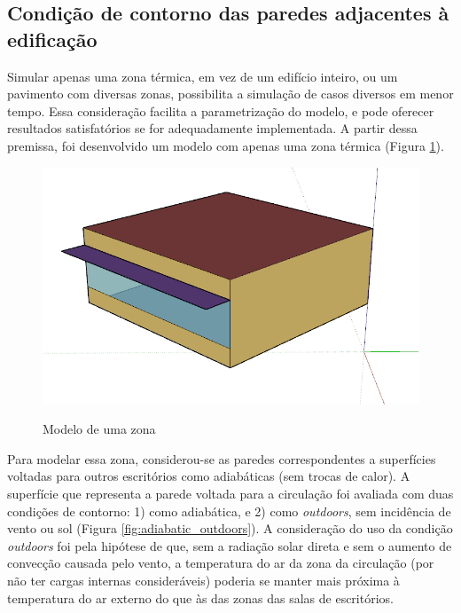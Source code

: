 \documentclass[brazil,hardcopy,openany]{ufscthesis} %
\newcommand{\figsize}{.6}
\begin{document}
\subsection*{Condição de contorno das paredes adjacentes à edificação}

Simular apenas uma zona térmica, em vez de um edifício inteiro, ou um pavimento com diversas zonas, possibilita a simulação de casos diversos em menor tempo.
Essa consideração facilita a parametrização do modelo, e pode oferecer resultados satisfatórios se for adequadamente implementada.
A partir dessa premissa, foi desenvolvido um modelo com apenas uma zona térmica (Figura \ref{fig:singlezone}).

\begin{figure}[h]
	\centering
	\caption{Modelo de uma zona}
	\includegraphics[width=\figsize\linewidth]{img/model.PNG}
	\label{fig:singlezone}
\end{figure}

Para modelar essa zona, considerou-se as paredes correspondentes a superfícies voltadas para outros escritórios como adiabáticas (sem trocas de calor). A superfície que representa a parede voltada para a circulação foi avaliada com duas condições de contorno: 1) como adiabática, e 2) como \textit{outdoors}, sem incidência de vento ou sol (Figura \ref{fig:adiabatic_outdoors}).	
A consideração do uso da condição \textit{outdoors} foi pela hipótese de que, sem a radiação solar direta e sem o aumento de convecção causada pelo vento, a temperatura do ar da zona da circulação (por não ter cargas internas consideráveis) poderia se manter mais próxima à temperatura do ar externo do que às das zonas das salas de escritórios.
\end{document}
